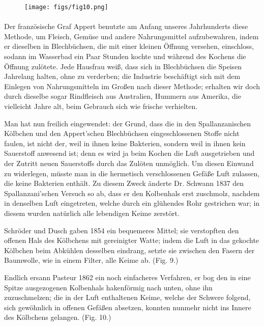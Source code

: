 \documentclass[a4paper, 11pt, oneside, english]{article}
\begin{document}
\begin{figure}[H]
\centering
\texttt{[image: figs/fig10.png]}
\caption{}
\end{figure}

\paragraph{}
Der französische Graf Appert benutzte am Anfang unseres Jahrhunderts diese Methode, um Fleisch, Gemüse und andere Nahrungsmittel aufzubewahren, indem er dieselben in Blechbüchsen, die mit einer kleinen Öffnung versehen, einschloss, sodann im Wasserbad ein Paar Stunden kochte und während des Kochens die Öffnung zulötete. Jede Hausfrau weiß, dass sich in Blechbüchsen die Speisen Jahrelang halten, ohne zu verderben; die Industrie beschäftigt sich mit dem Einlegen von Nahrungsmitteln im Großen nach dieser Methode; erhalten wir doch durch dieselbe sogar Rindfleisch aus Australien, Hummern aus Amerika, die vielleicht Jahre alt, beim Gebrauch sich wie frische verhielten.

Man hat nun freilich eingewendet: der Grund, dass die in den Spallanzanischen Kölbchen und den Appert'schen Blechbüchsen eingeschlossenen Stoffe nicht faulen, ist nicht der, weil in ihnen keine Bakterien, sondern weil in ihnen kein Sauerstoff anwesend ist; denn es wird ja beim Kochen die Luft ausgetrieben und der Zutritt neuen Sauerstoffs durch das Zulöten unmöglich. Um diesen Einwand zu widerlegen, müsste man in die hermetisch verschlossenen Gefäße Luft zulassen, die keine Bakterien enthält. Zu diesem Zweck änderte Dr. Schwann 1837 den Spallanzani'schen Versuch so ab, dass er den Kolbenhals erst zuschmolz, nachdem in denselben Luft eingetreten, welche durch ein glühendes Rohr gestrichen war; in diesem wurden natürlich alle lebendigen Keime zerstört.

Schröder und Dusch gaben 1854 ein bequemeres Mittel; sie verstopften den offenen Hals des Kölbchens mit gereinigter Watte; indem die Luft in das gekochte Kölbchen beim Abkühlen desselben eindrang, setzte sie zwischen den Fasern der Baumwolle, wie in einem Filter, alle Keime ab. (Fig. 9.)

Endlich ersann Pasteur 1862 ein noch einfacheres Verfahren, er bog den in eine Spitze ausgezogenen Kolbenhals hakenförmig nach unten, ohne ihn zuzuschmelzen; die in der Luft enthaltenen Keime, welche der Schwere folgend, sich gewöhnlich in offenen Gefäßen absetzen, konnten nunmehr nicht ins Innere des Kölbchens gelangen. (Fig. 10.)
\end{document}
